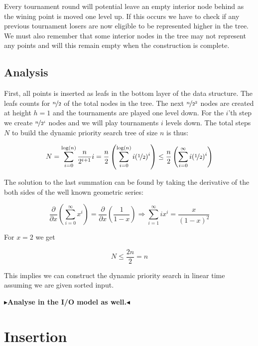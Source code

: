 \documentclass[twoside,11pt,openright]{report}
\newcommand{\todo}[1]{{\color[rgb]{.5,0,0}\textbf{$\blacktriangleright$#1$\blacktriangleleft$}}}
\begin{document}
Every tournament round will potential leave an empty interior node behind as the wining point is moved one level up. If this occurs we have to check if any previous tournament losers are now eligible to be represented higher in the tree. We must also remember that some interior nodes in the tree may not represent any points and will this remain empty when the construction is complete.

\subsection{Analysis}
First, all points is inserted as leafs in the bottom layer of the data structure. The leafs counts for $\nicefrac{n}{2}$ of the total nodes in the tree. The next $\nicefrac{n}{2^2}$ nodes are created at height $h = 1$ and the tournaments are played one level down. For the $i$'th step we create $\nicefrac{n}{2^i}$ nodes and we will play tournaments $i$ levels down. The total steps $N$ to build the dynamic priority search tree of size $n$ is thus:

$$ N = \sum\limits_{i=0}^{\log(n)} \frac{n}{2^{i+1}}i = \frac{n}{2} \left( \sum\limits_{i=0}^{\log(n)} i(\nicefrac{1}{2})^i \right) \leq \frac{n}{2} \left( \sum\limits_{i=0}^{\infty} i(\nicefrac{1}{2})^i \right)$$

The solution to the last summation can be found by taking the derivative of the both sides of the well known geometric series:

$$ \frac{\partial}{\partial x} \left( \sum\limits_{i=0}^{\infty} x^i \right) = \frac{\partial}{\partial x} \left( \frac{1}{1-x} \right) \Rightarrow \sum_{i=1}^{\infty} ix^i = \frac{x}{(1-x)^2} $$

For $x = 2$ we get

$$N \leq \frac{2n}{2} = n $$

This implies we can construct the dynamic priority search in linear time assuming we are given sorted input.

\todo{Analyse in the I/O model as well.}

\section{Insertion}
\end{document}
